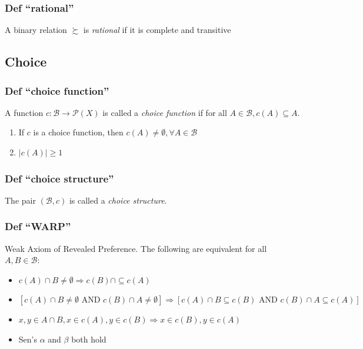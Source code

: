 \documentclass[
]{article}
\providecommand{\tightlist}{%
  \setlength{\itemsep}{0pt}\setlength{\parskip}{0pt}}
\begin{document}
\hypertarget{def-rational}{%
\subsubsection{Def ``rational''}\label{def-rational}}

A binary relation \(\succsim\) is \emph{rational} if it is complete and
transitive

\hypertarget{choice}{%
\subsection{Choice}\label{choice}}

\hypertarget{def-choice-function}{%
\subsubsection{Def ``choice function''}\label{def-choice-function}}

A function \(c: \mathcal{B} \rightarrow \mathcal{P}(X)\) is called a
\emph{choice function} if for all
\(A \in \mathcal{B}, c(A) \subseteq A\).

\begin{enumerate}
\def\labelenumi{\arabic{enumi}.}
\tightlist
\item
  If \(c\) is a choice function, then
  \(c(A) \neq \emptyset, \forall A \in \mathcal{B}\)
\item
  \(|c(A)| \geq 1\)
\end{enumerate}

\hypertarget{def-choice-structure}{%
\subsubsection{Def ``choice structure''}\label{def-choice-structure}}

The pair \((\mathcal{B}, c)\) is called a \emph{choice structure}.

\hypertarget{def-warp}{%
\subsubsection{Def ``WARP''}\label{def-warp}}

Weak Axiom of Revealed Preference. The following are equivalent for all
\(A, B \in \mathcal{B}\):

\begin{itemize}
\tightlist
\item
  \(c(A) \cap B \neq \emptyset \Rightarrow c(B) \cap \subseteq c(A)\)
\item
  \([c(A) \cap B \neq \emptyset \text{ AND } c(B) \cap A \neq \emptyset] \Rightarrow [c(A) \cap B \subseteq c(B) \text{ AND } c(B) \cap A \subseteq c(A)]\)
\item
  \(x, y \in A \cap B, x \in c(A), y \in c(B) \Rightarrow x \in c(B), y \in c(A)\)
\item
  Sen's \(\alpha\) and \(\beta\) both hold
\end{itemize}
\end{document}
